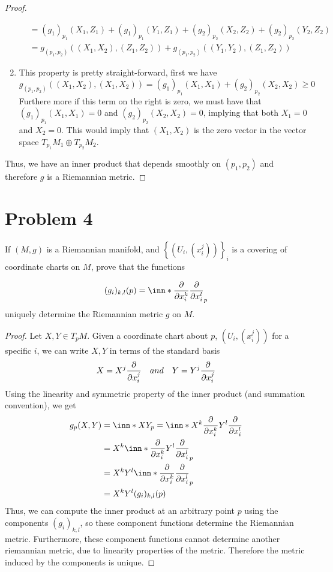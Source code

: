 \documentclass[a4paper]{article}
\begin{document}
\begin{proof}
\begin{enumerate}
\[\begin{aligned}
                                                         &=  (g_1)_{p_1}(X_1, Z_1) + (g_1)_{p_1}(Y_1, Z_1) + (g_2)_{p_2}(X_2, Z_2) + (g_2)_{p_2}(Y_2, Z_2) \\
                                                         &= g_{(p_1,p_2)}((X_1,X_2),(Z_1,Z_2)) + g_{(p_1,p_2)}((Y_1,Y_2),(Z_1,Z_2))
      \end{aligned}
    \]
    \item This property is pretty straight-forward, first we have
      \[
        g_{(p_1, p_2)}((X_1,X_2), (X_1,X_2)) =  (g_1)_{p_1}(X_1,X_1) + (g_2)_{p_2}(X_2, X_2) \geq 0
      \]
      Furthere more if this term on the right is zero, we must have that $(g_1)_{p_1}(X_1, X_1) = 0$ and $(g_2)_{p_2}(X_2, X_2) = 0$, implying that both $X_1 = 0$ and $X_2 = 0$. This would imply that $(X_1, X_2)$ is the zero vector in the vector space $T_{p_1}M_1 \oplus T_{p_2}M_2$.
  \end{enumerate}
  Thus, we have an inner product that depends smoothly on $(p_1, p_2)$ and therefore $g$ is a Riemannian metric.
\end{proof}

\section*{Problem 4}%
If $(M,g)$ is a Riemannian manifold, and $\left\{ (U_i, (x_i^j)) \right\}_i$ is a covering of coordinate charts on $M$, prove that the functions

\[
  (g_i)_{k,l}(p) = \inn*{\pdv{x^k_i}}{\pdv{x^l_i}}_p
\]
uniquely determine the Riemannian metric $g$ on $M$.

\begin{proof}
  Let $X,Y \in T_pM$. Given a coordinate chart about $p$, $(U_i, (x_i^j))$ for a specific $i$, we can write $X,Y$ in terms of the standard basis
  \[
    X = X^j \pdv{x_i^j} \quad and \quad Y = Y^j \pdv{x_i^j}
  \]
  Using the linearity and symmetric property of the inner product (and summation convention), we get 
  \[
    \begin{aligned}
      g_p(X,Y) &= \inn*{X}{Y}_p = \inn*{X^k \pdv{x_i^k}}{Y^l\pdv{x_i^l}} \\
               &=  X^k \inn*{\pdv{x_i^k}}{Y^l\pdv{x_i^l}}_p \\
               &= X^kY^l \inn*{\pdv{x_i^k}}{\pdv{x_i^l}}_p \\
               &= X^kY^l (g_i)_{k,l}(p)
    \end{aligned}
  \]
  Thus, we can compute the inner product at an arbitrary point $p$ using the components $(g_i)_{k,l}$, so these component functions determine the Riemannian metric. Furthermore, these component functions cannot determine another riemannian metric, due to linearity properties of the metric. Therefore the metric induced by the components is unique.
\end{proof}
\end{document}
